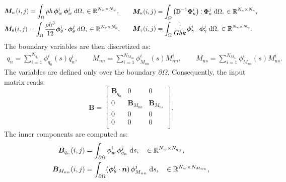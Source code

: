\documentclass[11pt]{article}
\def\onedot{$\mathsurround0pt\ldotp$}
\def\cddot{%
	\mathbin{\vcenter{\baselineskip.67ex
			\hbox{\onedot}\hbox{\onedot}}%
}}
\begin{document}
{\begin{equation}
\begin{gathered}
\begin{aligned}
		&\bm{M}_w(i,j) = \int_{\Omega} \rho h \, \bm{\phi}_w^i \, \bm{\phi}_w^j \d\Omega, \; \in \mathbb{R}^{N_w \times N_w}, \\
		&\bm{M}_\theta(i,j) = \int_{\Omega} \frac{\rho h^3}{12} \bm{\phi}_\theta^i \cdot \bm{\phi}_\theta^j \d\Omega, \; \in \mathbb{R}^{N_\theta \times N_\theta},\\
		\end{aligned} \qquad
		\begin{aligned}
		&\bm{M}_\kappa(i,j) = \int_{\Omega}  \left( \mathbb{D}^{-1} \bm{\Phi}_\kappa^i \right) \cddot \bm{\Phi}_\kappa^j \d\Omega, \; \in \mathbb{R}^{N_\kappa \times N_\kappa},\\
		&\bm{M}_{\gamma}(i,j) = \int_{\Omega} \frac{1}{G h k} \bm{\phi}_{\gamma}^i \cdot \bm{\phi}_{\gamma}^j \d\Omega, \; \in \mathbb{R}^{N_{\gamma} \times N_{\gamma}}. \\
		\end{aligned}
		\end{gathered}
		\end{equation}
		The boundary variables are then discretized as:
		\begin{equation}
		\begin{aligned}
		q_n = \sum_{i = 1}^{N_{q_n}} \phi_{q_n}^i(s) q_n^i, \qquad
		M_{nn} = \sum_{i = 1}^{N_{M_{nn}}} \phi_{M_{nn}}^i(s) M_{nn}^i, \qquad
		M_{ns} = \sum_{i = 1}^{N_{M_{ns}}} \phi_{M_{ns}}^i(s) M_{ns}^i.
		\end{aligned}
		\end{equation}
		The variables are defined only over the boundary $\partial\Omega$. Consequently, the input matrix reads:
		\begin{equation}
		\bm{B} = \begin{bmatrix}
		\bm{B}_{q_n} & 0 & 0 \\
		0 & \bm{B}_{M_{nn}} & \bm{B}_{M_{ns}} \\
		0 & 0 & 0 \\
		0 & 0 & 0 \\
		\end{bmatrix}.
		\end{equation}
		The inner components are computed as:
		\begin{equation}
		\begin{aligned}
		\bm{B}_{q_n}(i,j) &= \int_{\partial\Omega} {\phi}_{w}^i \, {\phi}_{q_n}^j \d{s}, \quad \in \mathbb{R}^{N_w \times N_{q_n}} , \\
		\bm{B}_{M_{nn}}(i,j) &= \int_{\partial\Omega} (\bm{\phi}_{\theta}^i \cdot \bm{n})\, \phi_{M_{nn}}^j \d{s}, \quad \in \mathbb{R}^{N_w \times N_{M_{nn}}} , \\

\end{aligned}
\end{equation}}
\end{document}
